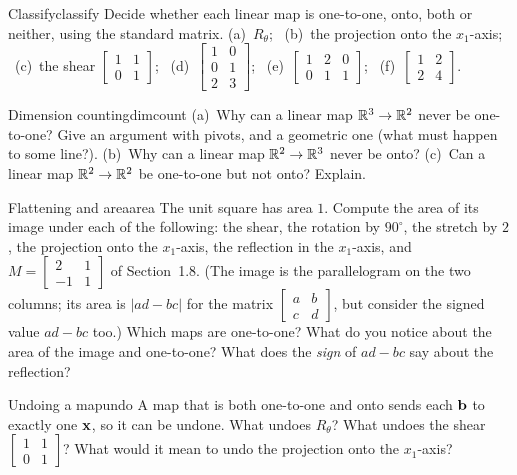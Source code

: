 \documentclass[11pt]{article}
\begin{document}
\begin{kc}{Classify}{classify}
Decide whether each linear map is one-to-one, onto, both or neither, using the standard matrix. (a)~$R_\theta$; \ (b)~the projection onto the $x_1$-axis; \ (c)~the shear $\begin{bmatrix}1&1\\0&1\end{bmatrix}$; \ (d)~$\begin{bmatrix}1&0\\0&1\\2&3\end{bmatrix}$; \ (e)~$\begin{bmatrix}1&2&0\\0&1&1\end{bmatrix}$; \ (f)~$\begin{bmatrix}1&2\\2&4\end{bmatrix}$.
\end{kc}

\begin{think}{Dimension counting}{dimcount}
(a)~Why can a linear map $\mathbb{R}^3\to\mathbb{R}^2$ never be one-to-one? Give an argument with pivots, and a geometric one (what must happen to some line?). (b)~Why can a linear map $\mathbb{R}^2\to\mathbb{R}^3$ never be onto? (c)~Can a linear map $\mathbb{R}^2\to\mathbb{R}^2$ be one-to-one but not onto? Explain.
\end{think}

\begin{think}{Flattening and area}{area}
The unit square has area $1$. Compute the area of its image under each of the following: the shear, the rotation by $90^\circ$, the stretch by $2$, the projection onto the $x_1$-axis, the reflection in the $x_1$-axis, and $M=\begin{bmatrix}2&1\\-1&1\end{bmatrix}$ of Section~1.8. (The image is the parallelogram on the two columns; its area is $|ad-bc|$ for the matrix $\begin{bmatrix}a&b\\c&d\end{bmatrix}$, but consider the signed value $ad-bc$ too.) Which maps are one-to-one? What do you notice about the area of the image and one-to-one? What does the \emph{sign} of $ad-bc$ say about the reflection?
\end{think}

\begin{think}{Undoing a map}{undo}
A map that is both one-to-one and onto sends each $\mathbf{b}$ to exactly one $\mathbf{x}$, so it can be undone. What undoes $R_\theta$? What undoes the shear $\begin{bmatrix}1&1\\0&1\end{bmatrix}$? What would it mean to undo the projection onto the $x_1$-axis?
\end{think}
\end{document}
